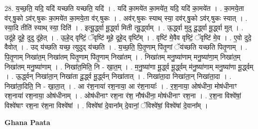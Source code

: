 \documentclass[17pt]{extarticle}
\begin{document}
28. य॒च्छ॒ति॒ यदि॒ यदि॑ यच्छति यच्छति॒ यदि॑ । . यदि॑ का॒मये॑त का॒मये॑त॒ यदि॒ यदि॑ का॒मये॑त । . का॒मये॒ता व॑र्.षु॒को ऽव॑र्.षुकः का॒मये॑त का॒मये॒ता व॑र्.षुकः । . अव॑र्.षुकः स्याथ् स्या॒ दव॑र्.षु॒को ऽव॑र्.षुकः स्यात् । . स्या॒दि तीति॑ स्याथ् स्या॒ दिति॑ । . इत्यू॒र्द्ध्वा मू॒र्द्ध्वा मिती त्यू॒र्द्ध्वाम् । . ऊ॒र्द्ध्वा मुदु दू॒र्द्ध्वा मू॒र्द्ध्वा मुत् । . उदू॑हे दूहे॒ दुदु दू॑हेत् । . ऊ॒हे॒द् वृष्टिं॒ ॅवृष्टि॑ मूहे दूहे॒द् वृष्टि᳚म् । . वृष्टि॑ मे॒वैव वृष्टिं॒ ॅवृष्टि॑ मे॒व । . ए॒वो दुदे॒ वैवोत् । . उद् य॑च्छति यच्छ॒ त्युदुद् य॑च्छति । . य॒च्छ॒ति॒ पि॒तृ॒णाम् पि॑तृ॒णां ॅय॑च्छति यच्छति पितृ॒णाम् । . पि॒तृ॒णाम् निखा॑त॒म् निखा॑तम् पितृ॒णाम् पि॑तृ॒णाम् निखा॑तम् । . निखा॑तम् मनु॒ष्या॑णाम् मनु॒ष्या॑णा॒म् निखा॑त॒म् निखा॑तम् मनु॒ष्या॑णाम् । . निखा॑त॒मिति॒ नि - खा॒त॒म् । . म॒नु॒ष्या॑णा मू॒र्द्ध्व मू॒र्द्ध्वम् म॑नु॒ष्या॑णाम् मनु॒ष्या॑णा मू॒र्द्ध्वम् । . ऊ॒र्द्ध्वन् निखा॑ता॒न् निखा॑ता दू॒र्द्ध्व मू॒र्द्ध्वन् निखा॑तात् । . निखा॑ता॒दा निखा॑ता॒न् निखा॑ता॒दा । . निखा॑ता॒दिति॒ नि - खा॒ता॒त् । . आ र॑श॒नाया॑ रश॒नाया॒ आ र॑श॒नायाः᳚ । . र॒श॒नाया॒ ओष॑धीना॒ मोष॑धीनाꣳ रश॒नाया॑ रश॒नाया॒ ओष॑धीनाम् । . ओष॑धीनाꣳ रश॒ना र॑श॒ नौष॑धीना॒ मोष॑धीनाꣳ रश॒ना । . र॒श॒ना विश्वे॑षां॒ विश्वे॑षाꣳ रश॒ना र॑श॒ना विश्वे॑षां । . विश्वे॑षां दे॒वाना᳚म् दे॒वानां॒ ॅविश्वे॑षां॒ विश्वे॑षां दे॒वाना᳚म् । \newline

\textbf{Ghana Paata } \newline
\end{document}
